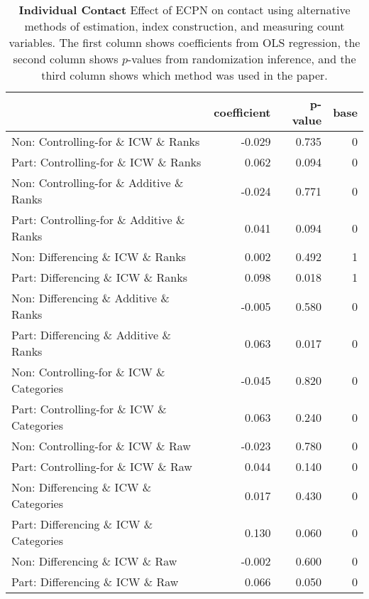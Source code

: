 \documentclass[
]{article}
\begin{document}
\begin{table}[H]
\begin{center}
\label{tab:contact_tab_ind}
\caption{\textbf{Individual Contact} Effect of ECPN on contact using alternative methods of estimation, index construction, and measuring count variables. The first column shows coefficients from OLS regression, the second column shows $p$-values from randomization inference, and the third column shows which method was used in the paper.}
\smallskip

\begin{tabular}{l|r|r|r}
\hline
  & coefficient & p-value & base\\
\hline
Non: Controlling-for \& ICW \& Ranks & -0.029 & 0.735 & 0\\
\hline
Part: Controlling-for \& ICW \& Ranks & 0.062 & 0.094 & 0\\
\hline
Non: Controlling-for \& Additive \& Ranks & -0.024 & 0.771 & 0\\
\hline
Part: Controlling-for \& Additive \& Ranks & 0.041 & 0.094 & 0\\
\hline
Non: Differencing \& ICW \& Ranks & 0.002 & 0.492 & 1\\
\hline
Part: Differencing \& ICW \& Ranks & 0.098 & 0.018 & 1\\
\hline
Non: Differencing \& Additive \& Ranks & -0.005 & 0.580 & 0\\
\hline
Part: Differencing \& Additive \& Ranks & 0.063 & 0.017 & 0\\
\hline
Non: Controlling-for \& ICW \& Categories & -0.045 & 0.820 & 0\\
\hline
Part: Controlling-for \& ICW \& Categories & 0.063 & 0.240 & 0\\
\hline
Non: Controlling-for \& ICW \& Raw & -0.023 & 0.780 & 0\\
\hline
Part: Controlling-for \& ICW \& Raw & 0.044 & 0.140 & 0\\
\hline
Non: Differencing \& ICW \& Categories & 0.017 & 0.430 & 0\\
\hline
Part: Differencing \& ICW \& Categories & 0.130 & 0.060 & 0\\
\hline
Non: Differencing \& ICW \& Raw & -0.002 & 0.600 & 0\\
\hline
Part: Differencing \& ICW \& Raw & 0.066 & 0.050 & 0\\
\hline
\end{tabular}


\end{center}
\end{table}
\end{document}

